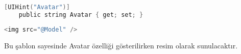 \documentclass[10pt,a4paper]{article}
\begin{document}
\begin{lstlisting}[label=code-UIHintOrnek1,caption=UIHint Örnek1,language=C]
	[UIHint("Avatar")]
	public string Avatar { get; set; }
\end{lstlisting}


\begin{lstlisting}[label=code-UIHintOrnek cshtml,caption=UIHint cshtml,language=C]
	<img src="@Model" />
\end{lstlisting}

Bu şablon sayesinde Avatar özelliği gösterilirken resim olarak sunulacaktır.






% 

\end{document}
